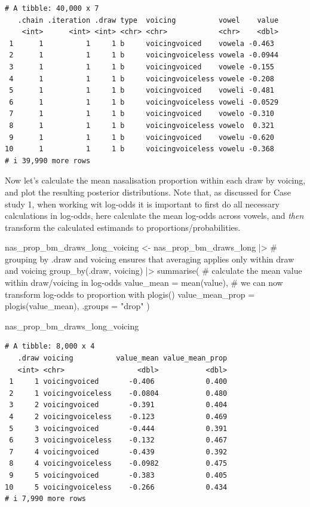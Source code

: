 \documentclass[
  authoryear,
  preprint,
  3p]{elsarticle}
\newenvironment{Shaded}{\begin{snugshade}}{\end{snugshade}}
\newcommand{\AttributeTok}[1]{\textcolor[rgb]{0.40,0.45,0.13}{#1}}
\newcommand{\CommentTok}[1]{\textcolor[rgb]{0.37,0.37,0.37}{#1}}
\newcommand{\FunctionTok}[1]{\textcolor[rgb]{0.28,0.35,0.67}{#1}}
\newcommand{\NormalTok}[1]{\textcolor[rgb]{0.00,0.23,0.31}{#1}}
\newcommand{\OtherTok}[1]{\textcolor[rgb]{0.00,0.23,0.31}{#1}}
\newcommand{\SpecialCharTok}[1]{\textcolor[rgb]{0.37,0.37,0.37}{#1}}
\newcommand{\StringTok}[1]{\textcolor[rgb]{0.13,0.47,0.30}{#1}}
\begin{document}
\begin{verbatim}
# A tibble: 40,000 x 7
   .chain .iteration .draw type  voicing          vowel    value
    <int>      <int> <int> <chr> <chr>            <chr>    <dbl>
 1      1          1     1 b     voicingvoiced    vowela -0.463 
 2      1          1     1 b     voicingvoiceless vowela -0.0944
 3      1          1     1 b     voicingvoiced    vowele -0.155 
 4      1          1     1 b     voicingvoiceless vowele -0.208 
 5      1          1     1 b     voicingvoiced    voweli -0.481 
 6      1          1     1 b     voicingvoiceless voweli -0.0529
 7      1          1     1 b     voicingvoiced    vowelo -0.310 
 8      1          1     1 b     voicingvoiceless vowelo  0.321 
 9      1          1     1 b     voicingvoiced    vowelu -0.620 
10      1          1     1 b     voicingvoiceless vowelu -0.368 
# i 39,990 more rows
\end{verbatim}

Now let's calculate the mean nasalisation proportion within each draw by
voicing, and plot the resulting posterior distributions. Note that, as
discussed for Case study 1, when working wit log-odds it is important to
first do all necessary calculations in log-odds, here calculate the mean
log-odds across vowels, and \emph{then} transform the calculated
estimands to proportions/probabilities.

\begin{Shaded}
\begin{Highlighting}[]
\NormalTok{nas\_prop\_bm\_draws\_long\_voicing }\OtherTok{\textless{}{-}}\NormalTok{ nas\_prop\_bm\_draws\_long }\SpecialCharTok{|\textgreater{}} 
  \CommentTok{\# grouping by .draw and voicing ensures that averaging applies only within draw and voicing}
  \FunctionTok{group\_by}\NormalTok{(.draw, voicing) }\SpecialCharTok{|\textgreater{}} 
  \FunctionTok{summarise}\NormalTok{(}
    \CommentTok{\# calculate the mean value within draw/voicing in log{-}odds}
    \AttributeTok{value\_mean =} \FunctionTok{mean}\NormalTok{(value),}
    \CommentTok{\# we can now transform log{-}odds to proportion with plogis()}
    \AttributeTok{value\_mean\_prop =} \FunctionTok{plogis}\NormalTok{(value\_mean),}
    \AttributeTok{.groups =} \StringTok{"drop"}
\NormalTok{  )}

\NormalTok{nas\_prop\_bm\_draws\_long\_voicing}
\end{Highlighting}
\end{Shaded}

\begin{verbatim}
# A tibble: 8,000 x 4
   .draw voicing          value_mean value_mean_prop
   <int> <chr>                 <dbl>           <dbl>
 1     1 voicingvoiced       -0.406            0.400
 2     1 voicingvoiceless    -0.0804           0.480
 3     2 voicingvoiced       -0.391            0.404
 4     2 voicingvoiceless    -0.123            0.469
 5     3 voicingvoiced       -0.444            0.391
 6     3 voicingvoiceless    -0.132            0.467
 7     4 voicingvoiced       -0.439            0.392
 8     4 voicingvoiceless    -0.0982           0.475
 9     5 voicingvoiced       -0.383            0.405
10     5 voicingvoiceless    -0.266            0.434
# i 7,990 more rows
\end{verbatim}
\end{document}

